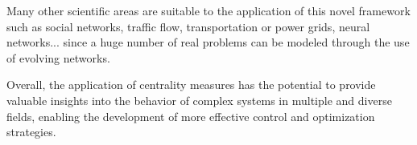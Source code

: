 Many other scientific areas are suitable to the application of this novel framework such as social networks, traffic flow, transportation or power grids, neural networks... since a huge number of real problems can be modeled through the use of evolving networks.

Overall, the application of centrality measures has the potential to provide valuable insights into the behavior of complex systems in multiple and diverse fields, enabling the development of more effective control and optimization strategies.